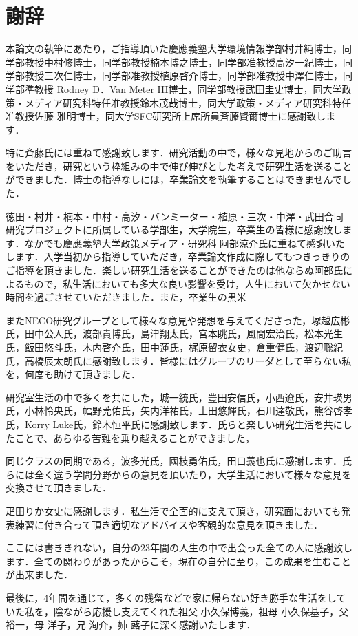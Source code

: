 \chapter*{謝辞}
\label{thanks}


本論文の執筆にあたり，ご指導頂いた慶應義塾大学環境情報学部村井純博士，同学部教授中村修博士，同学部教授楠本博之博士，同学部准教授高汐一紀博士，同学部教授三次仁博士，同学部准教授植原啓介博士，同学部准教授中澤仁博士，同学部準教授 Rodney D．Van Meter III博士，同学部教授武田圭史博士，同大学政策・メディア研究科特任准教授鈴木茂哉博士，同大学政策・メディア研究科特任准教授佐藤 雅明博士，同大学SFC研究所上席所員斉藤賢爾博士に感謝致します．


特に斉藤氏には重ねて感謝致します．研究活動の中で，様々な見地からのご助言をいただき，研究という枠組みの中で伸び伸びとした考えで研究生活を送ることができました．博士の指導なしには，卒業論文を執筆することはできませんでした．


徳田・村井・楠本・中村・高汐・バンミーター・植原・三次・中澤・武田合同研究プロジェクトに所属している学部生，大学院生，卒業生の皆様に感謝致します．なかでも慶應義塾大学政策メディア・研究科 阿部涼介氏に重ねて感謝いたします．入学当初から指導していただき，卒業論文作成に際してもつきっきりのご指導を頂きました．楽しい研究生活を送ることができたのは他ならぬ阿部氏によるもので，私生活においても多大な良い影響を受け，人生において欠かせない時間を過ごさせていただきました．また，卒業生の黒米


またNECO研究グループとして様々な意見や発想を与えてくださった，塚越広彬氏，田中公人氏，渡部貴博氏，島津翔太氏，宮本眺氏，風間宏治氏，松本光生氏，飯田悠斗氏，木内啓介氏，田中蓮氏，梶原留衣女史，倉重健氏，渡辺聡紀氏，高橋辰太朗氏に感謝致します．皆様にはグループのリーダとして至らない私を，何度も助けて頂きました．


研究室生活の中で多くを共にした，城一統氏，豊田安信氏，小西遼氏，安井瑛男氏，小林怜央氏，幅野莞佑氏，矢内洋祐氏，土田悠輝氏，石川達敬氏，熊谷啓孝氏，Korry Luke氏，鈴木恒平氏に感謝致します．氏らと楽しい研究生活を共にしたことで、あらゆる苦難を乗り越えることができました，


同じクラスの同期である，波多光氏，國枝勇佑氏，田口義也氏に感謝します．氏らには全く違う学問分野からの意見を頂いたり，大学生活において様々な意見を交換させて頂きました．

疋田りか女史に感謝します．私生活で全面的に支えて頂き，研究面においても発表練習に付き合って頂き適切なアドバイスや客観的な意見を頂きました．


ここには書ききれない，自分の23年間の人生の中で出会った全ての人に感謝致します．全ての関わりがあったからこそ，現在の自分に至り，この成果を生むことが出来ました．


最後に，4年間を通じて，多くの残留などで家に帰らない好き勝手な生活をしていた私を，陰ながら応援し支えてくれた祖父 小久保博義，祖母 小久保基子，父 裕一，母 洋子，兄 洵介，姉 蕗子に深く感謝いたします．



